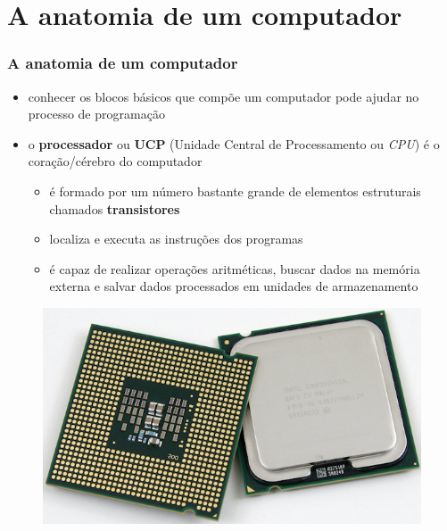 \documentclass[aspectratio=169]{beamer}
\begin{document}
\section{A anatomia de um computador}

\begin{frame}\frametitle{A anatomia de um computador}
\begin{itemize}
	\item conhecer os blocos básicos que compõe um computador pode ajudar no processo de programação
	\item o \textbf{processador} ou \textbf{UCP} (Unidade Central de Processamento ou \emph{CPU}) é o coração/cérebro do computador
	\begin{itemize}
		\item é formado por um número bastante grande de elementos estruturais chamados \textbf{transistores}
		\item localiza e executa as instruções dos programas
		\item é capaz de realizar operações aritméticas, buscar dados na memória externa e salvar dados processados em unidades de armazenamento
	\end{itemize}
\end{itemize}
\begin{figure}[h]
	\centering
	\includegraphics[height=0.25\paperheight]{pucrs-ep-fprog-unidade_01-introducao-laminas-ucp.png}
\end{figure}
\end{frame}
\end{document}

